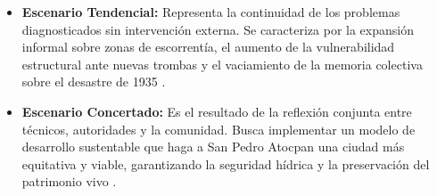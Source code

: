 \begin{itemize}
    \item \textbf{Escenario Tendencial:} Representa la continuidad de los 
            problemas diagnosticados sin intervención externa. Se caracteriza 
            por la expansión informal sobre zonas de escorrentía, 
            el aumento de la vulnerabilidad estructural ante nuevas trombas y el 
            vaciamiento de la memoria colectiva sobre el desastre de 1935 
            \cite{guia_inpc_ecuador}.
    \item \textbf{Escenario Concertado:} Es el resultado de la reflexión conjunta 
            entre técnicos, autoridades y la comunidad. Busca implementar un 
            modelo de desarrollo sustentable que haga a San Pedro Atocpan una 
            ciudad más equitativa y viable, garantizando la seguridad hídrica 
            y la preservación del patrimonio vivo \citep{balandrano2016conservacion, rodriguez2009tesis}.
\end{itemize}

